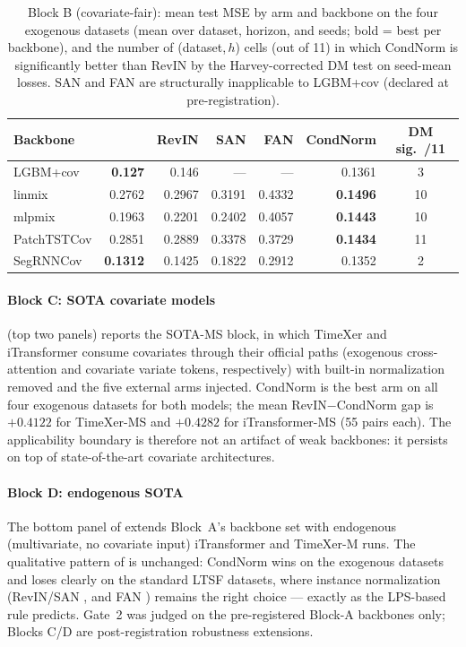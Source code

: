 \begin{table}[t]
\centering
\caption{Block B (covariate-fair): mean test MSE by arm and backbone on the
four exogenous datasets (mean over dataset, horizon, and seeds; bold = best
per backbone), and the number of (dataset,\,$h$) cells (out of 11) in which
CondNorm is significantly better than RevIN by the Harvey-corrected DM test on
seed-mean losses. SAN and FAN are structurally inapplicable to LGBM+cov
(declared at pre-registration).}
\label{tab:covfair}
\begin{tabular}{@{}lrrrrrc@{}}
\toprule
Backbone & \rawm{} & RevIN & SAN & FAN & CondNorm & DM sig.\ /11 \\
\midrule
LGBM+cov     & \textbf{0.127}  & 0.146  & ---    & ---    & 0.1361 & 3 \\
linmix       & 0.2762 & 0.2967 & 0.3191 & 0.4332 & \textbf{0.1496} & 10 \\
mlpmix       & 0.1963 & 0.2201 & 0.2402 & 0.4057 & \textbf{0.1443} & 10 \\
PatchTSTCov  & 0.2851 & 0.2889 & 0.3378 & 0.3729 & \textbf{0.1434} & 11 \\
SegRNNCov    & \textbf{0.1312} & 0.1425 & 0.1822 & 0.2912 & 0.1352 & 2 \\
\bottomrule
\end{tabular}
\end{table}

\paragraph{Block C: SOTA covariate models}
 (top two panels) reports the SOTA-MS block, in which
TimeXer \citep{wang2024timexer} and iTransformer \citep{liu2024itransformer}
consume covariates through their official paths (exogenous cross-attention and
covariate variate tokens, respectively) with built-in normalization removed
and the five external arms injected. CondNorm is the best arm on all four
exogenous datasets for both models; the mean RevIN$-$CondNorm gap is
$+0.4122$ for TimeXer-MS and $+0.4282$ for iTransformer-MS (55 pairs each).
The applicability boundary is therefore not an artifact of weak backbones: it
persists on top of state-of-the-art covariate architectures.

\paragraph{Block D: endogenous SOTA}
The bottom panel of  extends Block~A's backbone set with
endogenous (multivariate, no covariate input) iTransformer and TimeXer-M runs.
The qualitative pattern of  is unchanged: CondNorm wins on
the exogenous datasets and loses clearly on the standard LTSF datasets, where
instance normalization (RevIN/SAN \citealp{kim2022revin,liu2023san}, and FAN
\citealp{ye2024fan}) remains the right choice --- exactly as the LPS-based rule
predicts. Gate~2 was judged on the pre-registered Block-A backbones
only; Blocks C/D are post-registration robustness extensions.

